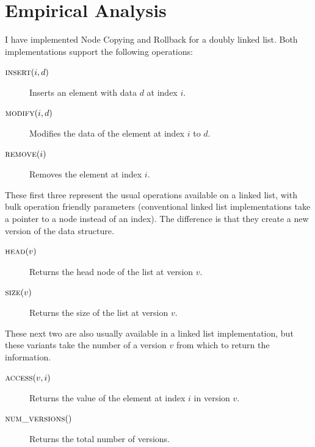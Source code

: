 \chapter{Empirical Analysis}

I have implemented Node Copying and Rollback for a doubly linked list. Both
implementations support the following operations:

\begin{description}

  \item[$\textsc{insert}(i,d)$] Inserts an element with data $d$ at index $i$.

  \item[$\textsc{modify}(i,d)$] Modifies the data of the element at index $i$ to
  $d$.

  \item[$\textsc{remove}(i)$] Removes the element at index $i$.

\end{description}

These first three represent the usual operations available on a linked list,
with bulk operation friendly parameters (conventional linked list
implementations take a pointer to a node instead of an index). The difference is
that they create a new version of the data structure.

\begin{description}

  \item[$\textsc{head}(v)$] Returns the head node of the list at version
  $v$.

  \item[$\textsc{size}(v)$] Returns the size of the list at version $v$.

\end{description}

These next two are also usually available in a linked list implementation, but
these variants take the number of a version $v$ from which to return the
information.

\begin{description}

  \item[$\textsc{access}(v,i)$] Returns the value of the element at index $i$ in
  version $v$.

  \item[$\textsc{num\_versions}()$] Returns the total number of versions.

\end{description}

